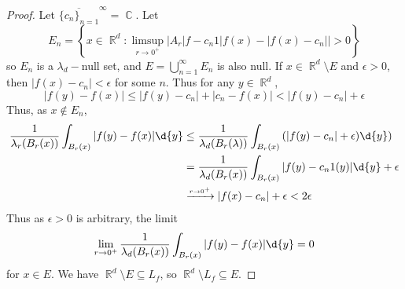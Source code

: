 \documentclass[11pt, a4paper]{memoir}
\DeclareMathOperator{\R}{{\mathbb{R}}}
\DeclareMathOperator{\C}{{\mathbb{C}}}
\newcommand{\fto}[1]{\ensuremath{\xrightarrow{\scriptscriptstyle{#1}}}}
\theoremstyle{change}
\theoremstyle{plain}
\theoremstyle{nonumberplain}
\newtheorem{proof}{Proof}
\begin{document}
\begin{proof}
    Let $\overline{\{c_n\}_{n=1}}^\infty=\C$.
    Let
    \begin{equation*}
        E_n=\left\{x\in\R^d:\limsup_{r\to 0^+}\left\lvert A_r|f-c_n1|f(x)-|f(x)-c_n|\right\rvert>0\right\}
    \end{equation*}
    so $E_n$ is a $\lambda_d-$null set, and $E=\bigcup_{n=1}^\infty E_n$ is also null.
    If $x\in\R^d\setminus E$ and $\epsilon>0$, then $|f(x)-c_n|<\epsilon$ for some $n$.
    Thus for any $y\in\R^d$,
    \begin{equation*}
        |f(y)-f(x)|\leq|f(y)-c_n|+|c_n-f(x)|<|f(y)-c_n|+\epsilon
    \end{equation*}
    Thus, as $x\notin E_n$,
    \begin{align*}
        \frac{1}{\lambda_r(B_r(x))}\int_{B_r(x)}|f(y)-f(x)|\d{y}&\leq\frac{1}{\lambda_d(B_r(\lambda))}\int_{B_r(x)}\left(|f(y)-c_n|+\epsilon)\d{y}\right)\\
                                                                &=\frac{1}{\lambda_d(B_r(x))}\int_{B_r(x)}|f(y)-c_n1(y)|\d{y}+\epsilon\\
                                                                &\fto{r\to 0^+}|f(x)-c_n|+\epsilon<2\epsilon
    \end{align*}
    Thus as $\epsilon>0$ is arbitrary, the limit
    \begin{equation*}
        \lim_{r\to 0^+}\frac{1}{\lambda_d(B_r(x))}\int_{B_r(x)}|f(y)-f(x)|\d{y}=0
    \end{equation*}
    for $x\in E$.
    We have $\R^d\setminus E\subseteq L_f$, so $\R^d\setminus L_f\subseteq E$.
\end{proof}
\end{document}
